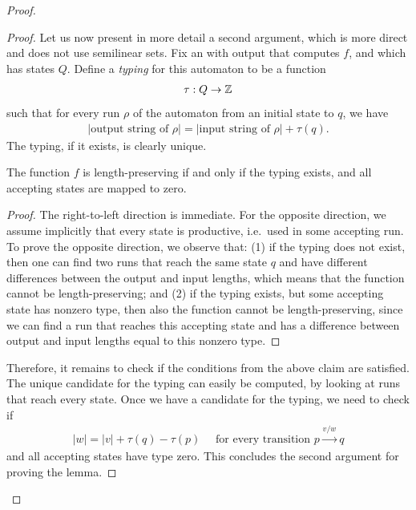 \begin{proof}
\begin{proof}
        Let us now present in more detail a second argument, which is more direct and does not use semilinear sets.
        Fix an \nfa with output that computes $f$, and which has states $Q$.  Define a \emph{typing} for this automaton to be a function 
        \begin{align*}
        \tau : Q \to {\mathbb Z}
        \end{align*}
        such that for every run $\rho$ of the automaton from an initial state to $q$, we have 
        \begin{align*}
        |\text{output string of $\rho$}| = |\text{input string of $\rho$}| + \tau(q).
        \end{align*}
        The typing, if it exists, is clearly unique.
        \begin{claim}\label{claim:typing-length-preserving}
            The function $f$ is length-preserving if and only if the typing exists, and all accepting states are mapped to zero. 
        \end{claim}
        \begin{proof}
            The right-to-left direction is immediate. For the opposite direction, we assume implicitly that every state is productive, i.e.~used in some accepting run. To prove the opposite direction,  we observe that: (1) if the typing does not exist, then one can find two runs that reach the same state $q$ and have different differences between the output and input lengths, which means that the function cannot be length-preserving; and (2) if the typing exists, but some accepting state has nonzero type, then also the function cannot be length-preserving, since we can find a run that reaches this accepting state and has a difference between output and input lengths equal to this nonzero type.
        \end{proof}
         Therefore, it remains to check if the conditions from the above claim are satisfied. The unique candidate for the typing can easily be computed, by looking at runs that reach every state.  Once we have a candidate for the typing, we need to check if 
        \begin{align*}
         |w|  =  |v| + \tau(q) - \tau(p) \quad \text{ for every transition } p \xrightarrow{ v /w} q
        \end{align*}
 and all accepting states have type zero. This concludes the second argument for  proving the lemma.
        \end{proof}




\end{proof}
